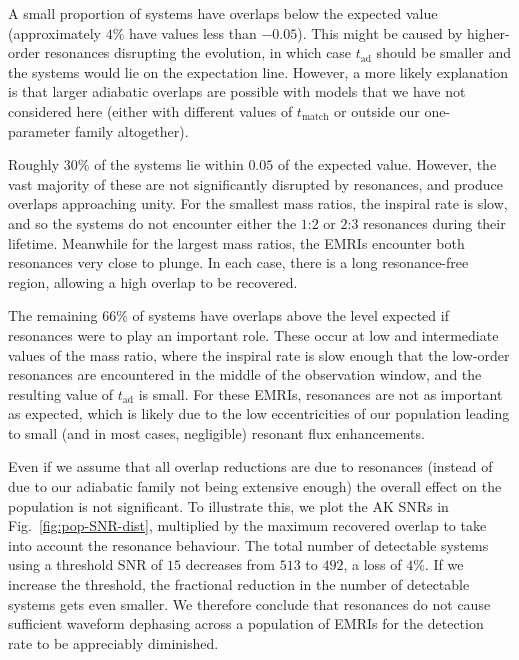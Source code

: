 \documentclass[aps,prd,amsfonts,amssymb,amsmath,nofootinbib,showpacs,superscriptaddress,twocolumn]{revtex4}
\newcommand{\figref}[1]{Fig.~\ref{fig:#1}}
\newcommand{\sub}[1]{\ensuremath{_\mathrm{#1}}}
\begin{document}
A small proportion of systems have overlaps below the expected value (approximately $4\%$ have values less than $-0.05$). This might be caused by higher-order resonances disrupting the evolution, in which case $t\sub{ad}$ should be smaller and the systems would lie on the expectation line. %
However, a more likely explanation is that larger adiabatic overlaps are possible with models that we have not considered here (either with different values of $t\sub{match}$ or outside our one-parameter family altogether).

Roughly $30\%$ of the systems lie within $0.05$ of the expected value. However, the vast majority of these are not significantly disrupted by resonances, and produce overlaps approaching unity. For the smallest mass ratios, the inspiral rate is slow, and so the systems do not encounter either the $1$:$2$ or $2$:$3$ resonances during their lifetime. Meanwhile for the largest mass ratios, the EMRIs encounter both resonances very close to plunge. In each case, there is a long resonance-free region, allowing a high overlap to be recovered.

The remaining $66\%$ of systems have overlaps above the level expected if resonances were to play an important role. These occur at low and intermediate values of the mass ratio, where the inspiral rate is slow enough that the low-order resonances are encountered in the middle of the observation window, and the resulting value of $t\sub{ad}$ is small. For these EMRIs, resonances are not as important as expected, which is likely due to the low eccentricities of our population leading to small (and in most cases, negligible) resonant flux enhancements.

Even if we assume that all overlap reductions are due to resonances (instead of due to our adiabatic family not being extensive enough) the overall effect on the population is not significant. To illustrate this, we plot the AK SNRs in \figref{pop-SNR-dist}, multiplied by the maximum recovered overlap to take into account the resonance behaviour. The total number of detectable systems using a threshold SNR of $15$ decreases from $513$ to $492$, a loss of $4\%$. If we increase the threshold, the fractional reduction in the number of detectable systems gets even smaller. We therefore conclude that resonances do not cause sufficient waveform dephasing across a population of EMRIs for the detection rate to be appreciably diminished.
\end{document}
